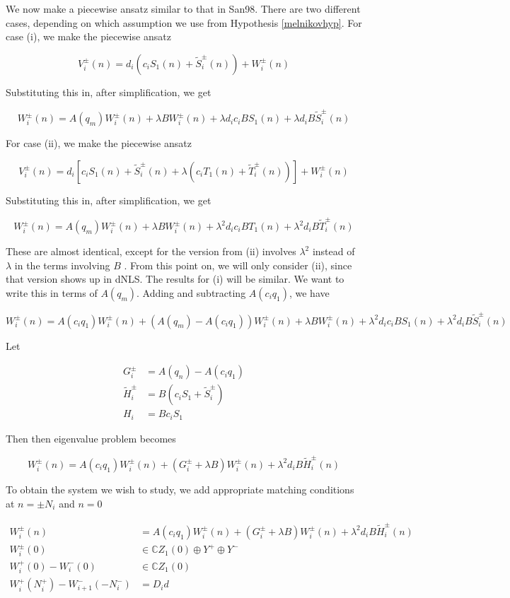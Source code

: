 \documentclass[12pt]{article}
\def\C{{\mathbb C}}
\begin{document}
We now make a piecewise ansatz similar to that in San98. There are two different cases, depending on which assumption we use from Hypothesis \ref{melnikovhyp}. For case (i), we make the piecewise ansatz

\[
V_i^\pm(n) = d_i ( c_i S_1(n) + \tilde{S}_i^\pm(n) ) + W_i^\pm(n)
\]

Substituting this in, after simplification, we get

\[
W_i^\pm(n) = A(q_m) W_i^\pm(n) + \lambda B W_i^\pm(n) + \lambda d_i c_i B S_1(n) + \lambda d_i B \tilde{S}_i^\pm(n)
\]

For case (ii), we make the piecewise ansatz

\[
V_i^\pm(n) = d_i [ c_i S_1(n) + \tilde{S}_i^\pm(n) + \lambda(c_i T_1(n) + \tilde{T}_i^\pm(n))] + W_i^\pm(n)
\]

Substituting this in, after simplification, we get

\[
W_i^\pm(n) = A(q_m) W_i^\pm(n) + \lambda B W_i^\pm(n) + \lambda^2 d_i c_i B T_1(n) + \lambda^2 d_i B \tilde{T}_i^\pm(n)
\]

These are almost identical, except for the version from (ii) involves $\lambda^2$ instead of $\lambda$ in the terms involving $B$ . From this point on, we will only consider (ii), since that version shows up in dNLS. The results for (i) will be similar. We want to write this in terms of $A(q_m)$. Adding and subtracting $A(c_i q_1)$, we have

\[
W_i^\pm(n) = A(c_i q_1) W_i^\pm(n) + (A(q_m) - A(c_i q_1)) W_i^\pm(n) + \lambda B W_i^\pm(n) + \lambda^2 d_i c_i B S_1(n) + \lambda^2 d_i B \tilde{S}_i^\pm(n)
\]

Let

\begin{align*}
G_i^\pm &= A(q_n) - A(c_i q_1) \\
\tilde{H}_i^\pm &= B( c_i S_1 + \tilde{S}_i^\pm ) \\
H_i &= B c_i S_1
\end{align*}

Then then eigenvalue problem becomes

\[
W_i^\pm(n) = A(c_i q_1) W_i^\pm(n) + (G_i^\pm + \lambda B) W_i^\pm(n) + \lambda^2 d_i B \tilde{H}_i^\pm(n)
\]

To obtain the system we wish to study, we add appropriate matching conditions at $n = \pm N_i$ and $n = 0$

\begin{align*}
W_i^\pm(n) &= A(c_i q_1) W_i^\pm(n) + (G_i^\pm + \lambda B) W_i^\pm(n) + \lambda^2 d_i B \tilde{H}_i^\pm(n) \\
W_i^\pm(0) &\in \C Z_1(0) \oplus Y^+ \oplus Y^- \\
W_i^+(0) - W_i^-(0) &\in \C Z_1(0) \\
W_i^+(N_i^+) - W_{i+1}^-(-N_i^-) &= D_i d
\end{align*}
\end{document}
